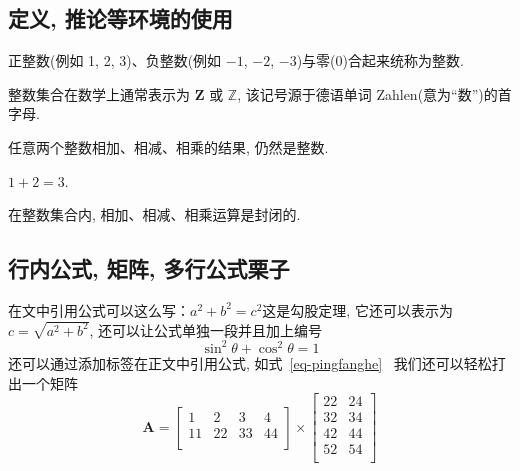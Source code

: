 \documentclass[forprint]{YAUthesis}
\begin{document}
\subsection{定义, 推论等环境的使用}
\begin{definition}[整数]
 正整数(例如 1, 2, 3)、负整数(例如 ${−1}$, $−2$, $−3$)与零(0)合起来统称为{\heiti 整数}.
\end{definition}

\begin{remark}
  整数集合在数学上通常表示为 $\mathbf{Z}$ 或 $\mathbb{Z}$, 该记号源于德语单词 Zahlen(意为``数'')的首字母.
\end{remark}

\begin{proposition}
任意两个整数相加、相减、相乘的结果, 仍然是整数.
\end{proposition}

\begin{example}
  $1+2=3$.
\end{example}

\begin{corollary}
   在整数集合内, 相加、相减、相乘运算是封闭的.
\end{corollary}

\subsection{行内公式, 矩阵, 多行公式栗子}
在文中引用公式可以这么写：$a^2+b^2=c^2$这是勾股定理, 它还可以表示为$c=\sqrt{a^2+b^2}$, 还可以让公式单独一段并且加上编号
\begin{equation}\label{eq-pingfanghe}
\sin^2{\theta}+\cos^2{\theta}=1 
\end{equation}
还可以通过添加标签在正文中引用公式, 如式~\eqref{eq-pingfanghe}~
我们还可以轻松打出一个矩阵
\begin{equation}
\bm{A}=\begin{bmatrix} %
1&2&3&4\\
11&22&33&44\\
\end{bmatrix}
\times\begin{bmatrix}
22&24\\
32&34\\
42&44\\
52&54\\
\end{bmatrix}
\end{equation}
\end{document}

